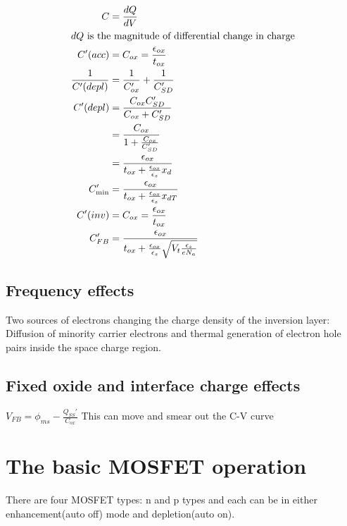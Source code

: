 \documentclass[article,oneside]{memoir}
\begin{document}
\begin{align*}
        C&=\frac{dQ}{dV}\\
        \intertext{$dQ$ is the magnitude of differential change in charge}
        C'(acc)&=C_{ox}=\frac{\epsilon_{ox}}{t_{ox}}\\
        \frac{1}{C'(depl)}&=\frac{1}{C_{ox}'}+\frac{1}{C_{SD}'}\\
        C'(depl)&=\frac{C_{ox}C_{SD}'}{C_{ox}+C'_{SD}}\\
        &=\frac{C_{ox}}{1+\frac{C_{ox}}{C_{SD}'}}\\
        &=\frac{\epsilon_{ox}}{t_{ox}+\frac{\epsilon_{ox}}{\epsilon_s}x_{d}}\\
        C'_{\textup{min}}&=\frac{\epsilon_{ox}}{t_{ox}+\frac{\epsilon_{ox}}{\epsilon_s}x_{dT}}\\
        C'(inv)&=C_{ox}=\frac{\epsilon_{ox}}{t_{ox}}\\
        C_{FB}'&=\frac{\epsilon_{ox}}{t_{ox}+\frac{\epsilon_{ox}}{\epsilon_s}\sqrt{V_t \frac{\epsilon_s}{eN_a}}}
\end{align*}
\section{Frequency effects}
Two sources of electrons changing the charge density of the inversion layer: Diffusion of minority carrier electrons and thermal generation of electron hole pairs inside the space charge region.
\section{Fixed oxide and interface charge effects}
$V_{FB}=\phi_{ms}-\frac{Q_{SS}'}{C_{ox}}$
This can move and smear out the C-V curve
\chapter{The basic MOSFET operation}


There are four MOSFET types: n and p types and each can be in either enhancement(auto off) mode and depletion(auto on).
\end{document}
